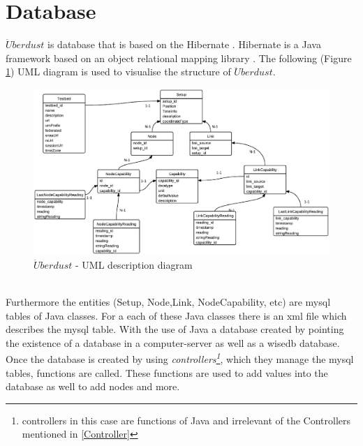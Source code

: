 \documentclass[12pt,a4paper,draft]{report}
\begin{document}
\section{Database}
%
$\ddot{U}berdust$ is database that is based on the Hibernate \cite{website:hibernate}. Hibernate is a Java framework based on an object relational mapping library \cite{website:hibernate-wiki}. The following (Figure \ref{uberdust-uml}) UML diagram is used to visualise the structure of $\ddot{U}berdust$.
%
\begin{figure}[H]
\centering
\includegraphics*[scale=0.6]{wisedb2}
\caption{$\ddot{U}berdust$ - UML description diagram}
\label{uberdust-uml}
\end{figure}
\ \\
Furthermore the entities (Setup, Node,Link, NodeCapability, etc) are mysql tables of Java classes. For a each of these Java classes there is an xml file which describes the mysql table. With the use of Java a database created by pointing the existence of a database in a computer-server as well as a wisedb  database. Once the database is created by using \textit{controllers\footnote{controllers in this case are functions of Java and irrelevant of the Controllers mentioned in \ref{Controller}}}, which they manage the mysql tables, functions are called. These functions are used to add values into the database as well to add nodes and more. 
%
\newpage
%
\end{document}
